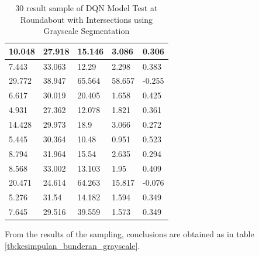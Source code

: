 \documentclass[conference]{IEEEtran}
\begin{document}
\begin{table}[H]
{\begin{tabular}{|l|l|l|l|l|}
				10.048          & 27.918     & 15.146           & 3.086           & 0.306       \\ \hline
				7.443           & 33.063     & 12.29            & 2.298           & 0.383       \\ \hline
				29.772          & 38.947     & 65.564           & 58.657          & -0.255      \\ \hline
				6.617           & 30.019     & 20.405           & 1.658           & 0.425       \\ \hline
				4.931           & 27.362     & 12.078           & 1.821           & 0.361       \\ \hline
				14.428          & 29.973     & 18.9             & 3.066           & 0.272       \\ \hline
				5.445           & 30.364     & 10.48            & 0.951           & 0.523       \\ \hline
				8.794           & 31.964     & 15.54            & 2.635           & 0.294       \\ \hline
				8.568           & 33.002     & 13.103           & 1.95            & 0.409       \\ \hline
				20.471          & 24.614     & 64.263           & 15.817          & -0.076      \\ \hline
				5.276           & 31.54      & 14.182           & 1.594           & 0.349       \\ \hline
				7.645           & 29.516     & 39.559           & 1.573           & 0.349       \\ \hline
			\end{tabular}%
		}
		\caption{30 result sample of DQN Model Test at Roundabout with Intersections using Grayscale Segmentation}
		\label{tb:hasilpengujian_bunderan_grayscale}
	\end{table}
	
	From the results of the sampling, conclusions are obtained as in table \ref{tb:kesimpulan_bunderan_grayscale}.
	
	\begin{table}[H]
		\caption{Summary of DQN Model Test at Roundabout with Intersections using Grayscale Segmentation}
		\label{tb:kesimpulan_bunderan_grayscale}
	\end{table}
	
\end{document}
